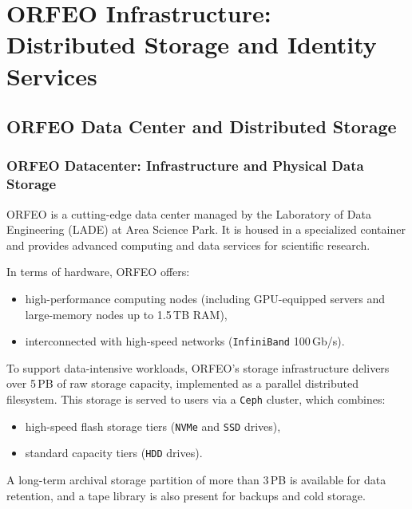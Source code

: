 \chapter{ORFEO Infrastructure: Distributed Storage and Identity Services}\label{chap:infra}

\section{ORFEO Data Center and Distributed Storage}

\subsection{ORFEO Datacenter: Infrastructure and Physical Data Storage}

ORFEO is a cutting-edge data center managed by the Laboratory of Data 
Engineering (LADE) at Area Science Park. It is housed in a specialized container 
and provides advanced computing and data services for scientific 
research\parencite{ORFEO_Docs_Home,LADEPage}. 

\medskip

In terms of hardware, ORFEO offers:
\begin{itemize}
	\item high-performance computing nodes (including GPU-equipped servers 
	and large-memory nodes up to 1.5\,TB RAM), 
	\item interconnected with high-speed networks (\texttt{InfiniBand} 100\,Gb/s)\parencite{ORFEO_Docs_Computational}.
\end{itemize}

To support data-intensive workloads, ORFEO’s storage infrastructure delivers 
over 5\,PB of raw storage capacity, implemented as a parallel distributed 
filesystem. This storage is served to users via a \texttt{Ceph} cluster, which 
combines:
\begin{itemize}
	\item high-speed flash storage tiers (\texttt{NVMe} and \texttt{SSD} drives), 
	\item standard capacity tiers (\texttt{HDD} drives)\parencite{ORFEO_Docs_Storage,orfeo-changelog-2024}.
\end{itemize}

A long-term archival storage partition of more than 3\,PB is available for data 
retention, and a tape library is also present for backups and cold 
storage\parencite{ORFEO_Docs_Storage,orfeo-changelog-2024}. 

\medskip

